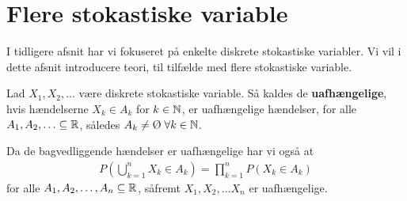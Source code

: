 \section{Flere stokastiske variable}
I tidligere afsnit har vi fokuseret på enkelte diskrete stokastiske variabler. Vi vil i dette afsnit introducere teori, til tilfælde med  flere stokastiske variable.
\begin{defn} \label{def:def3.8bogen}%
    Lad $X_1, X_2, \ldots$ være diskrete stokastiske variable. Så kaldes de \textbf{uafhængelige}, hvis hændelserne $X_k \in A_k$ for $k \in \N$, er uafhængelige hændelser, for alle $A_1, A_2, \ldots \subseteq \R$, således $A_k \neq \emptyset \; \forall k \in \N$.
\end{defn}

Da de bagvedliggende hændelser er uafhængelige har vi også at 
\begin{align*}
    P\left(\bigcup^n_{k = 1} X_k \in A_k\right)= \prod^n_{k = 1}P(X_k\in A_k)
\end{align*}
for alle $A_1, A_2, \ldots, A_n \subseteq \R$, såfremt $X_1, X_2, \ldots X_n$ er uafhængelige.

